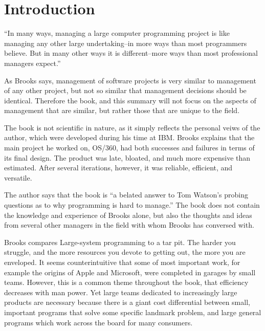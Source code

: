 \section{Introduction}
{\narrower
``In many ways, managing a large computer programming project is like managing any other large undertaking--in more ways than most programmers believe.  But in many other ways it is different--more ways than most professional managers expect.''
\par}

\medskip
\noindent
As Brooks says, management of software projects is very similar to management of any other project, but not so similar that management decisions should be identical.  Therefore the book, and this summary will not focus on the aspects of management that are similar, but rather those that are unique to the field.

The book is not scientific in nature, as it simply reflects the personal veiws of the author, which were developed during his time at IBM.  Brooks explains that the main project he worked on, OS/360, had both successes and failures in terms of its final design. The product was late, bloated, and much more expensive than estimated.  After several iterations, however, it was reliable, efficient, and versatile.

The author says that the book is ``a belated answer to Tom Watson's probing questions as to why programming is hard to manage.''  The book does not contain the knowledge and experience of Brooks alone, but also the thoughts and ideas from several other managers in the field with whom Brooks has conversed with.  

Brooks compares Large-system programming to a tar pit.  The harder you struggle, and the more resources you devote to getting out, the more you are enveloped.  It seems counterintuitive that some of most important work, for example the origins of Apple and Microsoft, were completed in garages by small teams.  However, this is a common theme throughout the book, that efficiency decreases with man power.  Yet large teams dedicated to increasingly large products are necessary because there is a giant cost differential between small, important programs that solve some specific landmark problem, and large general programs which work across the board for many consumers.


